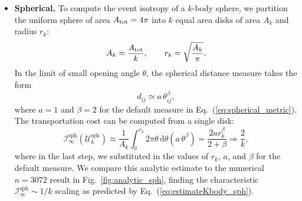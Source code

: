 \documentclass[letterpaper,11pt]{article}
\newcommand{\iso}[2]{\mathcal{I}^\text{#1}_{#2}}
\DeclareRobustCommand{\Fig}[1]{Fig.~\ref{#1}}
\DeclareRobustCommand{\Eq}[1]{Eq.~(\ref{#1})}
\begin{document}
\begin{itemize}

\item \textbf{Spherical.}  To compute the event isotropy of a $k$-body sphere, we partition the uniform sphere of area $A_{\rm tot} = 4\pi$ into $k$ equal area disks of area $A_k$ and radius $r_k$:
%
\begin{equation}
A_k = \frac{A_{\rm tot}}{k}, \qquad r_k = \sqrt{\frac{A_k}{\pi}}.
\end{equation}
%
In the limit of small opening angle $\theta$, the spherical distance measure takes the form
%
\begin{equation}
\label{eq:smallangledij}
d_{ij} \simeq a \, \theta_{ij}^\beta,
\end{equation}
%
where $a = 1$ and $\beta = 2$ for the default measure in \Eq{eq:spherical_metric}.
%
The transportation cost can be computed from a single disk:
%
\begin{equation}
\iso{sph}{\infty}(\mathcal{U}^\text{sph}_k) \approx \frac{1}{A_k} \int_0^{r_k} 2 \pi \theta \, \text{d} \theta \left(a \, \theta^\beta \right) = \frac{2 a r_k^\beta}{2+\beta} \Rightarrow \frac{2}{k},
\label{eq:estimateKbody_sph}
\end{equation}
%
where in the last step, we substituted in the values of $r_k$, $a$, and $\beta$ for the default measure.
%
We compare this analytic estimate to the numerical $n = 3072$ result in \Fig{fig:analytic_sph}, finding the characteristic $\iso{sph}{\infty} \sim 1/k$ scaling as predicted by \Eq{eq:estimateKbody_sph}.




\end{itemize}
\end{document}
